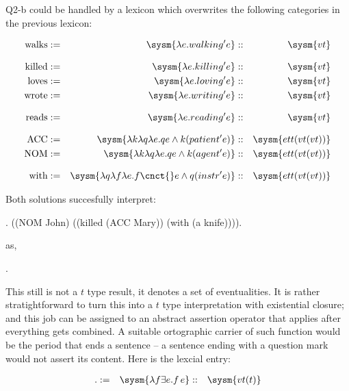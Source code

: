 \documentclass[10pt,a4paper]{exam}
\begin{document}
Q2-b could be handled by a lexicon which overwrites the following categories in the previous lexicon:


\begin{ulexicon}

\begin{align*}
	\text{walks}   &:=& \sysm{\lambda e.walking'e}  &::& \sysm{vt}\\[8pt]
	\text{killed}  &:=& \sysm{\lambda e.killing' e}   &::& \sysm{vt}\\
	\text{loves}   &:=& \sysm{\lambda e.loving' e}   &::& \sysm{vt}\\
	\text{wrote}   &:=& \sysm{\lambda e.writing' e}   &::& \sysm{vt}\\[8pt]
	\text{reads}   &:=& \sysm{\lambda e.reading' e}   &::& \sysm{vt}\\[8pt]
	\text{ACC}     &:=& \sysm{\lambda k\lambda q\lambda e.q e \land k (patient' e)} &::& \sysm{ett(vt(vt))}\\
	\text{NOM}     &:=& \sysm{\lambda k\lambda q\lambda e.q e \land k (agent' e)} &::& \sysm{ett(vt(vt))}\\[8pt]
	\text{with}    &:=& \sysm{\lambda q\lambda f \lambda e.f\cnct{} e \land q (instr' e)} &::& \sysm{ett(vt(vt))}\\
\end{align*}

\end{ulexicon}

Both solutions succesfully interpret:

\ex. ((NOM John) ((killed (ACC Mary)) (with (a knife)))).

as,

\ex. 


This still is not a $t$ type result, it denotes a set of eventualities. It is rather stratightforward to turn this into a $t$ type interpretation with existential closure; and this job can be assigned to an abstract assertion operator that applies after everything gets combined. A suitable ortographic carrier of such function would be the period that ends a sentence -- a sentence ending with a question mark would not assert its content. Here is the lexcial entry:

\begin{ulexicon}

\begin{align*}
	\text{.}    &:=& \sysm{\lambda f \exists e.f\, e} &::& \sysm{vt(t)}\\
\end{align*}

\end{ulexicon}
\end{document}

